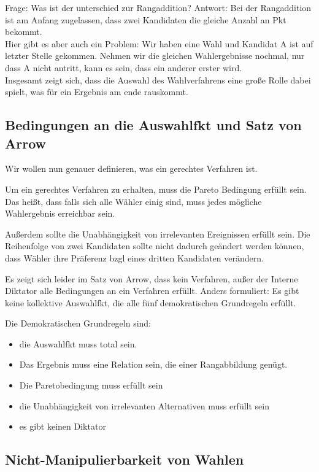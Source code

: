 \documentclass[]{article}
\begin{document}
Frage: Was ist der unterschied zur Rangaddition? 
Antwort: Bei der Rangaddition ist am Anfang zugelassen, dass zwei Kandidaten die gleiche Anzahl an Pkt bekommt.  \\

Hier gibt es aber auch ein Problem: Wir haben eine Wahl und Kandidat A ist auf letzter Stelle gekommen. Nehmen wir die gleichen Wahlergebnisse nochmal, nur dass A nicht antritt, kann es sein, dass ein anderer erster wird. \\

Insgesamt zeigt sich, dass die Auswahl des Wahlverfahrens eine große Rolle dabei spielt, was für ein Ergebnis am ende rauskommt. 

\subsection{Bedingungen an die Auswahlfkt und Satz von Arrow}

Wir wollen nun genauer definieren, was ein gerechtes Verfahren ist.  

Um ein gerechtes Verfahren zu erhalten, muss die Pareto Bedingung erfüllt sein. Das heißt, dass falls sich alle Wähler einig sind, muss jedes mögliche Wahlergebnis erreichbar sein.

Außerdem sollte die Unabhängigkeit von irrelevanten Ereignissen erfüllt sein. Die Reihenfolge von zwei Kandidaten sollte nicht dadurch geändert werden können, dass Wähler ihre Präferenz bzgl eines dritten Kandidaten verändern. 

Es zeigt sich leider im Satz von Arrow, dass kein Verfahren, außer der Interne Diktator alle Bedingungen an ein Verfahren erfüllt. Anders formuliert: Es gibt keine kollektive Auswahlfkt, die alle fünf demokratischen Grundregeln erfüllt.

Die Demokratischen Grundregeln sind:

\begin{itemize}
 \item die Auswahlfkt muss total sein.
 \item Das Ergebnis muss eine Relation sein, die einer Rangabbildung genügt.
 \item Die Paretobedingung muss erfüllt sein
 \item die Unabhängigkeit von irrelevanten Alternativen muss erfüllt sein
 \item es gibt keinen Diktator
\end{itemize}

\subsection{Nicht-Manipulierbarkeit von Wahlen}
\end{document}

